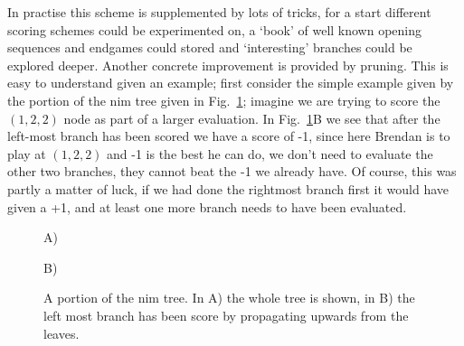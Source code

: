 \documentclass[11pt,a4paper]{scrartcl}
\begin{document}
In practise this scheme is supplemented by lots of tricks, for a start
different scoring schemes could be experimented on, a \lq{}book\rq{}
of well known opening sequences and endgames could stored and
\lq{}interesting\rq{} branches could be explored deeper. Another
concrete improvement is provided by pruning. This is easy to
understand given an example; first consider the simple example given
by the portion of the nim tree given in Fig.~\ref{fig:nim-alpha-beta};
imagine we are trying to score the $(1,2,2)$ node as part of a larger
evaluation. In Fig.~\ref{fig:nim-alpha-beta}B we see that after the
left-most branch has been scored we have a score of -1, since here
Brendan is to play at $(1,2,2)$ and -1 is the best he can do, we don't
need to evaluate the other two branches, they cannot beat the -1 we
already have. Of course, this was partly a matter of luck, if we had
done the rightmost branch first it would have given a +1, and at least
one more branch needs to have been evaluated.

\begin{figure}
A)
\begin{center}
\end{center}
B)
\begin{center}
\end{center}
\caption{A portion of the nim tree. In A) the whole tree is shown, in
  B) the left most branch has been score by propagating upwards from
  the leaves.\label{fig:nim-alpha-beta}}
\end{figure}
\end{document}
